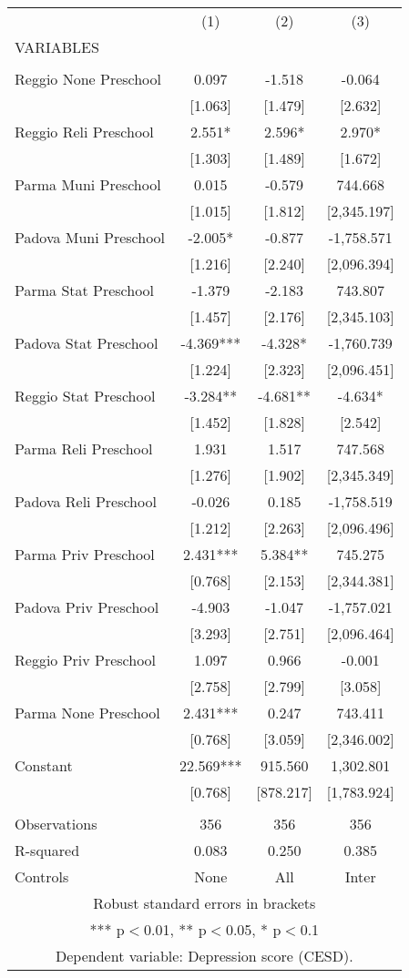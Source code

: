 \begin{tabular}{lccc} \hline
 & (1) & (2) & (3) \\
VARIABLES &  &  &  \\ \hline
 &  &  &  \\
Reggio None Preschool & 0.097 & -1.518 & -0.064 \\
 & [1.063] & [1.479] & [2.632] \\
Reggio Reli Preschool & 2.551* & 2.596* & 2.970* \\
 & [1.303] & [1.489] & [1.672] \\
Parma Muni Preschool & 0.015 & -0.579 & 744.668 \\
 & [1.015] & [1.812] & [2,345.197] \\
Padova Muni Preschool & -2.005* & -0.877 & -1,758.571 \\
 & [1.216] & [2.240] & [2,096.394] \\
Parma Stat Preschool & -1.379 & -2.183 & 743.807 \\
 & [1.457] & [2.176] & [2,345.103] \\
Padova Stat Preschool & -4.369*** & -4.328* & -1,760.739 \\
 & [1.224] & [2.323] & [2,096.451] \\
Reggio Stat Preschool & -3.284** & -4.681** & -4.634* \\
 & [1.452] & [1.828] & [2.542] \\
Parma Reli Preschool & 1.931 & 1.517 & 747.568 \\
 & [1.276] & [1.902] & [2,345.349] \\
Padova Reli Preschool & -0.026 & 0.185 & -1,758.519 \\
 & [1.212] & [2.263] & [2,096.496] \\
Parma Priv Preschool & 2.431*** & 5.384** & 745.275 \\
 & [0.768] & [2.153] & [2,344.381] \\
Padova Priv Preschool & -4.903 & -1.047 & -1,757.021 \\
 & [3.293] & [2.751] & [2,096.464] \\
Reggio Priv Preschool & 1.097 & 0.966 & -0.001 \\
 & [2.758] & [2.799] & [3.058] \\
Parma None Preschool & 2.431*** & 0.247 & 743.411 \\
 & [0.768] & [3.059] & [2,346.002] \\
Constant & 22.569*** & 915.560 & 1,302.801 \\
 & [0.768] & [878.217] & [1,783.924] \\
 &  &  &  \\
Observations & 356 & 356 & 356 \\
R-squared & 0.083 & 0.250 & 0.385 \\
 Controls & None & All & Inter \\ \hline
\multicolumn{4}{c}{ Robust standard errors in brackets} \\
\multicolumn{4}{c}{ *** p$<$0.01, ** p$<$0.05, * p$<$0.1} \\
\multicolumn{4}{c}{ Dependent variable: Depression score (CESD).} \\
\end{tabular}
